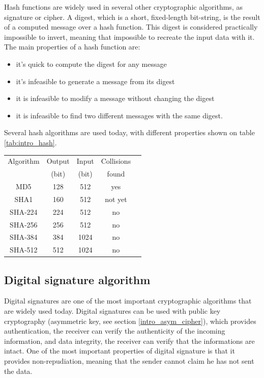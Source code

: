 Hash functions are widely used in several other cryptographic
algorithms, as signature or cipher.
A digest, which is a short, fixed-length bit-string, is the result of a computed
message over a hash function.
This digest is considered practically impossible to invert, meaning
that impossible to recreate the input data with it.
The main properties of a hash function are:
\begin{itemize}[noitemsep]
  \item it's quick to compute the digest for any message
  \item it's infeasible to generate a message from its digest
  \item it is infeasible to modify a message without changing the digest
  \item it is infeasible to find two different messages with the same
  digest.\newline
\end{itemize}

Several hash algorithms are used today, with different properties shown on table
\ref{tab:intro_hash}. 

\begin{center}

\begin{tabular}{| c | *{4}{c|}}
 \hline
 Algorithm 	& Output & Input & Collisions \\
           	& (bit)  & (bit) & found		 \\
 \hline
 MD5 	   	& 128	& 512	& yes \cite{RFC7465} \\
 SHA1	   	& 160	& 512	& not yet \\
 \hline
SHA-224		& 224	& 512	& no \\
SHA-256		& 256	& 512	& no \\
SHA-384		& 384	& 1024	& no \\
SHA-512		& 512	& 1024	& no \\
\hline
 
\end{tabular}
\label{tab:intro_hash}

\end{center}

\subsection{Digital signature algorithm}
\label{intro_sign}

Digital signatures are one of the most important cryptographic algorithms that
are widely used today. Digital signatures can be used with public key
cryptography (asymmetric key, see section \ref{intro_asym_cipher}), which
provides authentication, the receiver can verify the authenticity of the
incoming information, and data integrity, the receiver can verify that the
informations are intact.
One of the most important properties of digital signature is that it provides
non-repudiation, meaning that the sender cannot claim he has not sent the
data.

